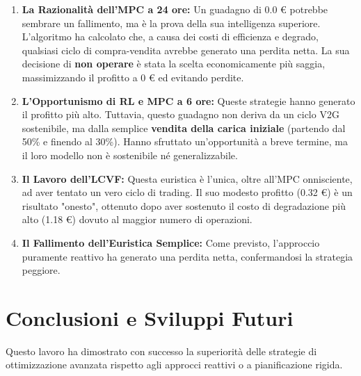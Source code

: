 \documentclass[11pt, a4paper]{article}
\begin{document}
\begin{enumerate}
    \item \textbf{La Razionalità dell'MPC a 24 ore:} Un guadagno di 0.0 € potrebbe sembrare un fallimento, ma è la prova della sua intelligenza superiore. L'algoritmo ha calcolato che, a causa dei costi di efficienza e degrado, qualsiasi ciclo di compra-vendita avrebbe generato una perdita netta. La sua decisione di \textbf{non operare} è stata la scelta economicamente più saggia, massimizzando il profitto a 0 € ed evitando perdite.

    \item \textbf{L'Opportunismo di RL e MPC a 6 ore:} Queste strategie hanno generato il profitto più alto. Tuttavia, questo guadagno non deriva da un ciclo V2G sostenibile, ma dalla semplice \textbf{vendita della carica iniziale} (partendo dal 50\% e finendo al 30\%). Hanno sfruttato un'opportunità a breve termine, ma il loro modello non è sostenibile né generalizzabile.

    \item \textbf{Il Lavoro dell'LCVF:} Questa euristica è l'unica, oltre all'MPC onnisciente, ad aver tentato un vero ciclo di trading. Il suo modesto profitto (0.32 €) è un risultato "onesto", ottenuto dopo aver sostenuto il costo di degradazione più alto (1.18 €) dovuto al maggior numero di operazioni.

    \item \textbf{Il Fallimento dell'Euristica Semplice:} Come previsto, l'approccio puramente reattivo ha generato una perdita netta, confermandosi la strategia peggiore.
\end{enumerate}

\section{Conclusioni e Sviluppi Futuri}

Questo lavoro ha dimostrato con successo la superiorità delle strategie di ottimizzazione avanzata rispetto agli approcci reattivi o a pianificazione rigida.
\end{document}
